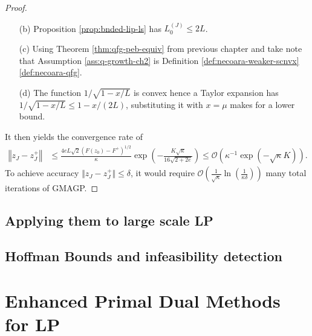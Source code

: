 \documentclass[12pt]{report}
\begin{document}
\begin{proof}
\begin{enumerate}
                \item [(b)] Proposition \ref{prop:bnded-lip-ls} has $L_0^{(J)} \le 2L$. 
                \item [(c)] Using Theorem \ref{thm:qfg-peb-equiv} from previous chapter and take note that Assumption \ref{ass:q-growth-ch2} is Definition \ref{def:necoara-weaker-scnvx}\ref{def:necoara-qfg}. 
                \item [(d)] The function $1/\sqrt{1 - x/L}$ is convex hence a Taylor expansion has $1/\sqrt{1 - x/L} \le 1 - x/(2L) $, substituting it with $x = \mu$ makes for a lower bound. 
            \end{enumerate}
            It then yields the convergence rate of 
            \begin{align*}
                \left\Vert z_J - z^+_J\right\Vert 
                &\le \frac{4eL\sqrt{2}(F(z_0) - F^+)^{1/2}}{\kappa}
                \exp\left(
                    - \frac{K\sqrt{\kappa}}{16\sqrt{2 + 2e}}
                \right) 
                \le 
                \mathcal O\left(
                    \kappa^{-1}\exp\left(-\sqrt{\kappa}K\right)
                \right). 
            \end{align*}
            To achieve accuracy $\Vert z_J - z^+_J\Vert \le \delta$, it would require $\mathcal O\left(\frac{1}{\sqrt{\kappa}}\ln\left(\frac{1}{\kappa\delta}\right)\right)$ many total iterations of GMAGP. 
        \end{proof}
        
    \section{Applying them to large scale LP}
    
    \section{Hoffman Bounds and infeasibility detection}
    
\chapter{Enhanced Primal Dual Methods for LP}
    






\end{document}
